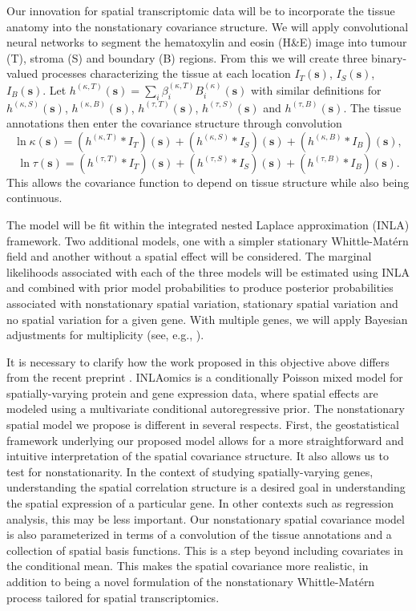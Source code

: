 \documentclass[pdflatex,sn-mathphys-num]{sn-jnl}%
\theoremstyle{thmstyleone}%
\theoremstyle{thmstyletwo}%
\theoremstyle{thmstylethree}%
\begin{document}
Our innovation for spatial transcriptomic data will be to incorporate the tissue anatomy into the nonstationary covariance structure. We will apply convolutional neural networks \cite{al2019integrating} to segment the hematoxylin and eosin (H\&E) image into tumour (T), stroma (S) and boundary (B) regions. From this we will create three binary-valued processes characterizing the tissue at each location $I_{T}(\mathbf{s})$, $I_{S}(\mathbf{s})$, $I_{B}(\mathbf{s})$. Let $h^{(\kappa,T)}(\mathbf{s}) = \sum_{i}\beta^{(\kappa,T)}_{i}B_{i}^{(\kappa)}(\mathbf{s})$ with similar definitions for
$h^{(\kappa,S)}(\mathbf{s})$, $h^{(\kappa,B)}(\mathbf{s})$, $h^{(\tau,T)}(\mathbf{s})$, $h^{(\tau,S)}(\mathbf{s})$ and $h^{(\tau,B)}(\mathbf{s})$. The tissue annotations then enter the covariance structure through convolution
$$
\ln \kappa(\mathbf{s}) = (h^{(\kappa,T)} \ast I_{T})(\mathbf{s}) + (h^{(\kappa,S)} \ast I_{S})(\mathbf{s}) + (h^{(\kappa,B)} \ast I_{B})(\mathbf{s}),
$$
$$
\ln \tau(\mathbf{s}) = (h^{(\tau,T)} \ast I_{T})(\mathbf{s}) + (h^{(\tau,S)} \ast I_{S})(\mathbf{s}) + (h^{(\tau,B)} \ast I_{B})(\mathbf{s}).
$$
This allows the covariance function to depend on tissue structure while also being continuous.

The model will be fit within the integrated nested Laplace approximation (INLA) framework. Two additional models, one with a simpler stationary Whittle-Mat\'ern field and another without a spatial effect will be considered. The marginal likelihoods associated with each of the three models will be estimated using INLA \cite{hubin2016estimating} and combined with prior model probabilities to produce posterior probabilities associated with nonstationary spatial variation, stationary spatial variation and no spatial variation for a given gene. With multiple genes, we will apply Bayesian adjustments for multiplicity (see, e.g., \cite{whittemore2007bayesian}).

It is necessary to clarify how the work proposed in this objective above differs from the recent preprint \cite{arnroth2025inlaomics}. INLAomics is a conditionally Poisson mixed model for spatially-varying protein and gene expression data, where spatial effects are modeled using a multivariate conditional autoregressive prior. The nonstationary spatial model we propose is different in several respects. First, the geostatistical framework underlying our proposed model allows for a more straightforward and intuitive interpretation of the spatial covariance structure. It also allows us to test for nonstationarity. In the context of studying spatially-varying genes, understanding the spatial correlation structure is a desired goal in understanding the spatial expression of a particular gene. In other contexts such as regression analysis, this may be less important. Our nonstationary spatial covariance model is also parameterized in terms of a convolution of the tissue annotations and a collection of spatial basis functions. This is a step beyond including covariates in the conditional mean. This makes the spatial covariance more realistic, in addition to being a novel formulation of the nonstationary Whittle-Mat\'ern process tailored for spatial transcriptomics.
\end{document}
